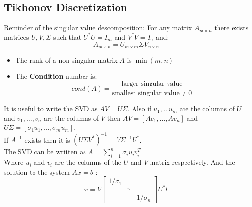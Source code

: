 \subsection{Tikhonov Discretization}
Reminder of the singular value descomposition: For any matrix $A_{m\times n} $ there exists matrices $U,V,\Sigma$ such that $U^*U=I_m$ and $V^*V=I_n$ and:
$$A_{m\times n}= U_{m\times m}\Sigma V_{n\times n} $$
\begin{remarks}
\begin{itemize}
\item The rank of  a non-singular matrix $A$ is $\min(m,n)$ 
\item The \textbf{Condition} number is:
$$cond(A)=\frac{\text{larger singular value}}{\text{smallest singular value}\neq 0}$$
\end{itemize}
\end{remarks}
It is useful to write the SVD as $AV=U\Sigma$. Also if $u_1,\ldots u_m$ are the columns of $U$ and $v_1,\ldots, v_n$ are the columns of $V$ then $AV=[Av_1,\ldots, Av_n]$ and $U\Sigma = [\sigma_1 u_1,\ldots, \sigma_m u_m] $.\\
If $A ^{-1} $ exists then it is $(U\Sigma V^*)^{-1} = V\Sigma ^{-1} U^*$.\\
The SVD can be written as $A=\sum_{i=1}^n \sigma_iu_iv_i^T$ \\
Where $u_i$ and $v_i$ are the columns of the $U$ and $V$ matrix respectively.
And the solution to the system $Ax=b$ :
$$ x= V\begin{bmatrix} 1/\sigma_1 &   &   \\    & \ddots &  \\   &   &  1/\sigma_n \end{bmatrix} U^*b$$

